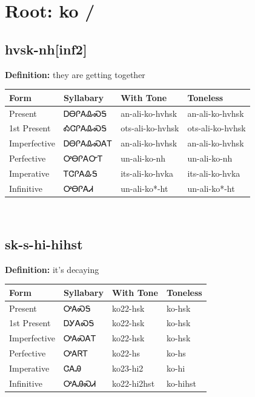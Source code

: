 \documentclass{article}%
\begin{document}
%
\normalsize%
\section*{Root: ko / }%
\subsection*{hvsk-nh[inf2]}%
\textbf{Definition: }%
they are getting together%
\\[0.5em]%
\begin{tabular}{|l|l|l|l|}%
\hline%
\textbf{Form}&\textbf{Syllabary}&\textbf{With Tone}&\textbf{Toneless}\\%
\hline%
Present&ᎠᎾᎵᎪᎲᏍᎦ&an{-}ali{-}ko{-}hvhsk&an{-}ali{-}ko{-}hvhsk\\%
1st Present&ᎣᏣᎵᎪᎲᏍᎦ&ots{-}ali{-}ko{-}hvhsk&ots{-}ali{-}ko{-}hvhsk\\%
Imperfective&ᎠᎾᎵᎪᎲᏍᎪᎢ&an{-}ali{-}ko{-}hvhsk&an{-}ali{-}ko{-}hvhsk\\%
Perfective&ᎤᎾᎵᎪᏅᎢ&un{-}ali{-}ko{-}nh&un{-}ali{-}ko{-}nh\\%
Imperative&ᎢᏣᎵᎪᎲᎦ&its{-}ali{-}ko{-}hvka&its{-}ali{-}ko{-}hvka\\%
Infinitive&ᎤᎾᎵᎪᏗ&un{-}ali{-}ko*{-}ht&un{-}ali{-}ko*{-}ht\\%
\hline%
\end{tabular}%
\\[1em]%
\subsection*{sk-s-hi-hihst}%
\textbf{Definition: }%
it’s decaying%
\\[0.5em]%
\begin{tabular}{|l|l|l|l|}%
\hline%
\textbf{Form}&\textbf{Syllabary}&\textbf{With Tone}&\textbf{Toneless}\\%
\hline%
Present&ᎤᎪᏍᎦ&ko22{-}hsk&ko{-}hsk\\%
1st Present&ᎠᎩᎪᏍᎦ&ko22{-}hsk&ko{-}hsk\\%
Imperfective&ᎤᎪᏍᎪᎢ&ko22{-}hsk&ko{-}hsk\\%
Perfective&ᎤᎪᏒᎢ&ko22{-}hs&ko{-}hs\\%
Imperative&ᏣᎪᎯ&ko23{-}hi2&ko{-}hi\\%
Infinitive&ᎤᎪᎯᏍᏗ&ko22{-}hi2hst&ko{-}hihst\\%
\hline%
\end{tabular}%
\\[1em]%
\end{document}
